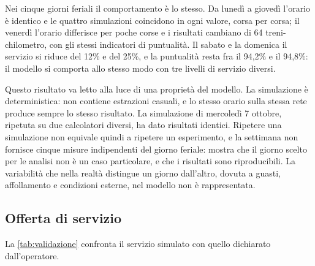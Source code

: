 Nei cinque giorni feriali il comportamento è lo stesso. Da lunedì a giovedì l'orario è identico e le quattro simulazioni coincidono in ogni valore, corsa per corsa; il venerdì l'orario differisce per poche corse e i risultati cambiano di 64 treni-chilometro, con gli stessi indicatori di puntualità. Il sabato e la domenica il servizio si riduce del 12\% e del 25\%, e la puntualità resta fra il 94,2\% e il 94,8\%: il modello si comporta allo stesso modo con tre livelli di servizio diversi.

Questo risultato va letto alla luce di una proprietà del modello. La simulazione è deterministica: non contiene estrazioni casuali, e lo stesso orario sulla stessa rete produce sempre lo stesso risultato. La simulazione di mercoledì 7 ottobre, ripetuta su due calcolatori diversi, ha dato risultati identici. Ripetere una simulazione non equivale quindi a ripetere un esperimento, e la settimana non fornisce cinque misure indipendenti del giorno feriale: mostra che il giorno scelto per le analisi non è un caso particolare, e che i risultati sono riproducibili. La variabilità che nella realtà distingue un giorno dall'altro, dovuta a guasti, affollamento e condizioni esterne, nel modello non è rappresentata.

\subsection{Offerta di servizio}
La \cref{tab:validazione} confronta il servizio simulato con quello dichiarato dall'operatore.

